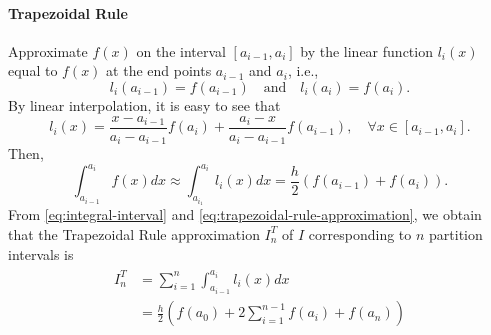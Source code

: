 \paragraph{Trapezoidal Rule}
Approximate $ f(x) $ on the interval $ [a_{i-1}, a_i] $ by the linear function
    $ l_i(x) $ equal to $ f(x) $ at the end points $ a_{i-1} $ and $ a_i $,
    i.e.,
\begin{equation*}
    l_i(a_{i-1}) = f(a_{i-1}) \quad \text{and} \quad l_i(a_i) = f(a_i).
\end{equation*}
By linear interpolation, it is easy to see that
\begin{equation}
    l_i(x) = \frac{x - a_{i-1}}{a_i - a_{i-1}} f(a_i) +
        \frac{a_i - x}{a_i - a_{i-1}} f(a_{i-1}), \quad
        \forall x \in [a_{i-1}, a_i].
\end{equation}
Then,
\begin{equation}
    \int_{a_{i-1}}^{a_i} f(x) dx \approx \int_{a_{i_1}}^{a_i} l_i(x) dx =
        \frac{h}{2} (f(a_{i-1}) + f(a_i)).
    \label{eq:trapezoidal-rule-approximation}
\end{equation}
From \eqref{eq:integral-interval} and \eqref{eq:trapezoidal-rule-approximation},
    we obtain that the Trapezoidal Rule approximation $ I_n^T $ of $ I $
    corresponding to $ n $ partition intervals is
\begin{align}
    \begin{split}
        I_n^T
            &= \sum_{i=1}^{n} \int_{a_{i-1}}^{a_i} l_i(x) dx \\
            &= \frac{h}{2} \left( f(a_0) + 2 \sum_{i=1}^{n-1} f(a_i) +
                f(a_n) \right)
        \label{eq:trapezoidal-rule-sum}
    \end{split}
\end{align}

